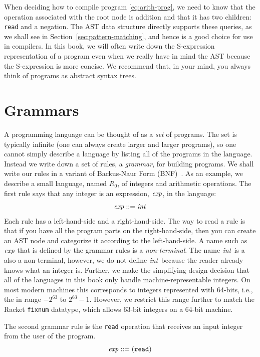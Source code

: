 \documentclass[11pt]{book}
\begin{document}
When deciding how to compile program \eqref{eq:arith-prog}, we need to
know that the operation associated with the root node is addition and
that it has two children: \texttt{read} and a negation. The AST data
structure directly supports these queries, as we shall see in
Section~\ref{sec:pattern-matching}, and hence is a good choice for use
in compilers. In this book, we will often write down the S-expression
representation of a program even when we really have in mind the AST
because the S-expression is more concise.  We recommend that, in your
mind, you always think of programs as abstract syntax trees.

\section{Grammars}
\label{sec:grammar}

A programming language can be thought of as a \emph{set} of programs.
The set is typically infinite (one can always create larger and larger
programs), so one cannot simply describe a language by listing all of
the programs in the language. Instead we write down a set of rules, a
\emph{grammar}, for building programs. We shall write our rules in a
variant of Backus-Naur Form (BNF)~\citep{Backus:1960aa,Knuth:1964aa}.
As an example, we describe a small language, named $R_0$, of
integers and arithmetic operations. The first rule says that any
integer is an expression, $\mathit{exp}$, in the language:
\begin{equation}
\mathit{exp} ::= \mathit{int}  \label{eq:arith-int}
\end{equation}
%
Each rule has a left-hand-side and a right-hand-side. The way to read
a rule is that if you have all the program parts on the
right-hand-side, then you can create an AST node and categorize it
according to the left-hand-side.
%
A name such as $\mathit{exp}$ that is
defined by the grammar rules is a \emph{non-terminal}.
%
The name $\mathit{int}$ is a also a non-terminal, however,
we do not define $\mathit{int}$ because the
reader already knows what an integer is.
%
Further, we make the simplifying design decision that all of the languages in
this book only handle machine-representable integers.  On most modern machines
this corresponds to integers represented with 64-bits, i.e., the in range
$-2^{63}$ to $2^{63}-1$.
%
However, we restrict this range further to match the Racket \texttt{fixnum}
datatype, which allows 63-bit integers on a 64-bit machine.

The second grammar rule is the \texttt{read} operation that receives
an input integer from the user of the program.
\begin{equation}
  \mathit{exp} ::= (\texttt{read}) \label{eq:arith-read}
\end{equation}
\end{document}
